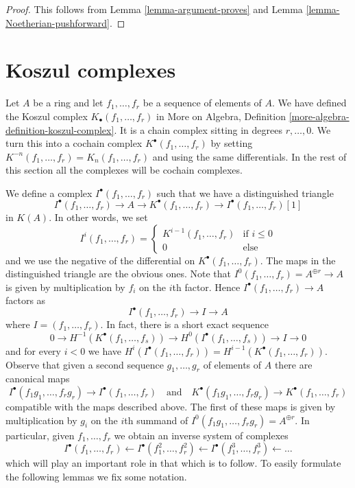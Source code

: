 \begin{proof}
This follows from Lemma \ref{lemma-argument-proves} and
Lemma \ref{lemma-Noetherian-pushforward}.
\end{proof}






\section{Koszul complexes}
\label{section-koszul}

\noindent
Let $A$ be a ring and let $f_1, \ldots, f_r$ be a sequence of elements
of $A$. We have defined the Koszul complex
$K_\bullet(f_1, \ldots, f_r)$ in
More on Algebra, Definition \ref{more-algebra-definition-koszul-complex}.
It is a chain complex sitting in degrees $r, \ldots, 0$.
We turn this into a cochain complex $K^\bullet(f_1, \ldots, f_r)$
by setting $K^{-n}(f_1, \ldots, f_r) = K_n(f_1, \ldots, f_r)$
and using the same differentials. In the rest of this section all
the complexes will be cochain complexes.

\medskip\noindent
We define a complex $I^\bullet(f_1, \ldots, f_r)$
such that we have a distinguished triangle
$$
I^\bullet(f_1, \ldots, f_r) \to
A \to
K^\bullet(f_1, \ldots, f_r) \to
I^\bullet(f_1, \ldots, f_r)[1]
$$
in $K(A)$.
In other words, we set
$$
I^i(f_1, \ldots, f_r) =
\left\{
\begin{matrix}
K^{i - 1}(f_1, \ldots, f_r) & \text{if } i \leq 0 \\
0 & \text{else}
\end{matrix}
\right.
$$
and we use the negative of the differential on $K^\bullet(f_1, \ldots, f_r)$.
The maps in the distinguished triangle are the obvious ones. Note that
$I^0(f_1, \ldots, f_r) = A^{\oplus r} \to A$ is given by
multiplication by $f_i$ on the $i$th factor.
Hence $I^\bullet(f_1, \ldots, f_r) \to A$ factors as
$$
I^\bullet(f_1, \ldots, f_r) \to I \to A
$$
where $I = (f_1, \ldots, f_r)$. In fact, there is a short exact sequence
$$
0 \to H^{-1}(K^\bullet(f_1, \ldots, f_s)) \to
H^0(I^\bullet(f_1, \ldots, f_s)) \to I \to 0
$$
and for every $i < 0$ we have
$H^i(I^\bullet(f_1, \ldots, f_r)) = H^{i - 1}(K^\bullet(f_1, \ldots, f_r))$.
Observe that given a second sequence $g_1, \ldots, g_r$ of elements of $A$
there are canonical maps
$$
I^\bullet(f_1g_1, \ldots, f_rg_r) \to I^\bullet(f_1, \ldots, f_r)
\quad\text{and}\quad
K^\bullet(f_1g_1, \ldots, f_rg_r) \to K^\bullet(f_1, \ldots, f_r)
$$
compatible with the maps described above. The first of these maps is
given by multiplication by $g_i$ on the $i$th summand of
$I^0(f_1g_1, \ldots, f_rg_r) = A^{\oplus r}$. In particular, given
$f_1, \ldots, f_r$ we obtain an inverse system of complexes
\begin{equation}
\label{equation-system}
I^\bullet(f_1, \ldots, f_r) \leftarrow
I^\bullet(f_1^2, \ldots, f_r^2) \leftarrow
I^\bullet(f_1^3, \ldots, f_r^3) \leftarrow \ldots
\end{equation}
which will play an important role in that which is to follow.
To easily formulate the following lemmas we fix some notation.

